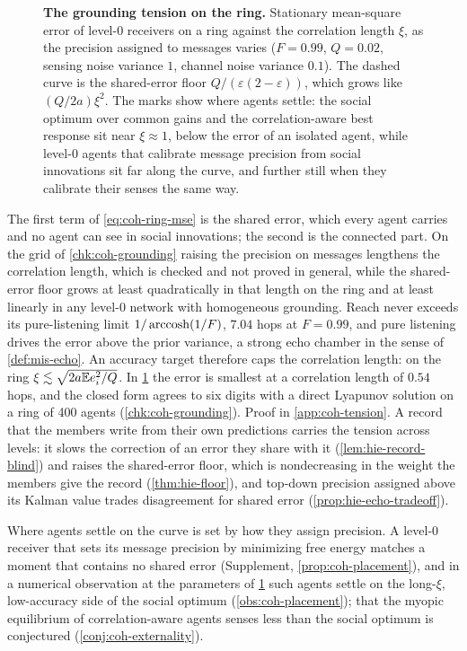 \begin{figure}[t]
  \centering
  
  \caption{\textbf{The grounding tension on the ring.} Stationary mean-square error of level-0 receivers on a ring against the correlation length $\xi$, as the precision assigned to messages varies ($F=0.99$, $Q=0.02$, sensing noise variance $1$, channel noise variance $0.1$). The dashed curve is the shared-error floor $Q/(\varepsilon(2-\varepsilon))$, which grows like $(Q/2a)\xi^2$. The marks show where agents settle: the social optimum over common gains and the correlation-aware best response sit near $\xi\approx1$, below the error of an isolated agent, while level-0 agents that calibrate message precision from social innovations sit far along the curve, and further still when they calibrate their senses the same way.}
  \label{fig:coh-tension}
\end{figure}

The first term of \eqref{eq:coh-ring-mse} is the shared error, which every agent carries and no agent can see in social innovations; the second is the connected part. On the grid of \cref{chk:coh-grounding} raising the precision on messages lengthens the correlation length, which is checked and not proved in general, while the shared-error floor grows at least quadratically in that length on the ring and at least linearly in any level-0 network with homogeneous grounding. Reach never exceeds its pure-listening limit $1/\operatorname{arccosh}(1/F)$, $7.04$ hops at $F=0.99$, and pure listening drives the error above the prior variance, a strong echo chamber in the sense of \cref{def:mis-echo}. An accuracy target therefore caps the correlation length: on the ring $\xi\lesssim\sqrt{2a\mathbb{E} e_i^2/Q}$. In \cref{fig:coh-tension} the error is smallest at a correlation length of $0.54$ hops, and the closed form agrees to six digits with a direct Lyapunov solution on a ring of 400 agents (\cref{chk:coh-grounding}). Proof in \cref{app:coh-tension}. A record that the members write from their own predictions carries the tension across levels: it slows the correction of an error they share with it (\cref{lem:hie-record-blind}) and raises the shared-error floor, which is nondecreasing in the weight the members give the record (\cref{thm:hie-floor}), and top-down precision assigned above its Kalman value trades disagreement for shared error (\cref{prop:hie-echo-tradeoff}).

Where agents settle on the curve is set by how they assign precision. A level-0 receiver that sets its message precision by minimizing free energy matches a moment that contains no shared error (Supplement, \cref{prop:coh-placement}), and in a numerical observation at the parameters of \cref{fig:coh-tension} such agents settle on the long-$\xi$, low-accuracy side of the social optimum (\cref{obs:coh-placement}); that the myopic equilibrium of correlation-aware agents senses less than the social optimum is conjectured (\cref{conj:coh-externality}).

